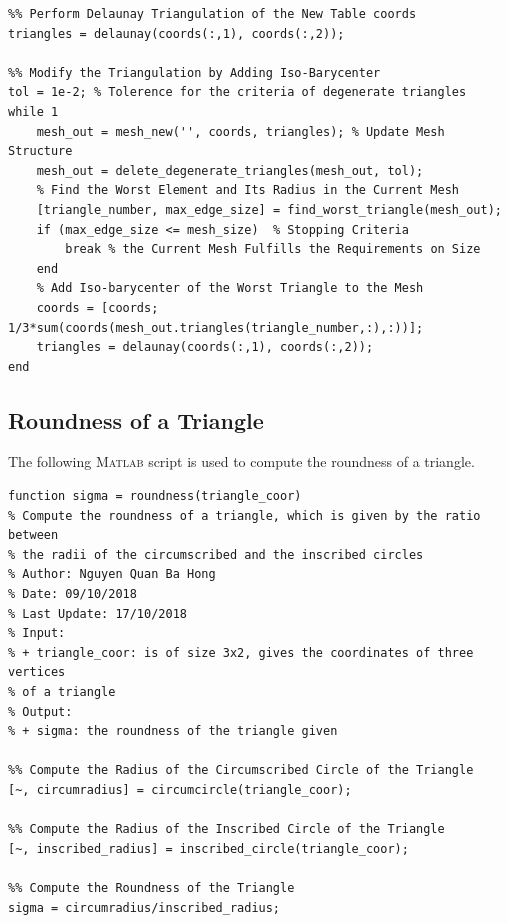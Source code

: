 \documentclass[11pt,a4paper,center,notitlepage]{article}
\numberwithin{equation}{section}
\begin{document}
\begin{verbatim}
%% Perform Delaunay Triangulation of the New Table coords
triangles = delaunay(coords(:,1), coords(:,2));

%% Modify the Triangulation by Adding Iso-Barycenter
tol = 1e-2; % Tolerence for the criteria of degenerate triangles
while 1
    mesh_out = mesh_new('', coords, triangles); % Update Mesh Structure
    mesh_out = delete_degenerate_triangles(mesh_out, tol);
    % Find the Worst Element and Its Radius in the Current Mesh
    [triangle_number, max_edge_size] = find_worst_triangle(mesh_out);
    if (max_edge_size <= mesh_size)  % Stopping Criteria
        break % the Current Mesh Fulfills the Requirements on Size
    end
    % Add Iso-barycenter of the Worst Triangle to the Mesh
    coords = [coords; 1/3*sum(coords(mesh_out.triangles(triangle_number,:),:))];
    triangles = delaunay(coords(:,1), coords(:,2));
end
\end{verbatim}
\subsection{Roundness of a Triangle}
The following \textsc{Matlab} script is used to compute the roundness of a triangle. 
\begin{verbatim}
function sigma = roundness(triangle_coor)
% Compute the roundness of a triangle, which is given by the ratio between
% the radii of the circumscribed and the inscribed circles
% Author: Nguyen Quan Ba Hong
% Date: 09/10/2018
% Last Update: 17/10/2018
% Input:
% + triangle_coor: is of size 3x2, gives the coordinates of three vertices
% of a triangle
% Output:
% + sigma: the roundness of the triangle given

%% Compute the Radius of the Circumscribed Circle of the Triangle 
[~, circumradius] = circumcircle(triangle_coor);

%% Compute the Radius of the Inscribed Circle of the Triangle
[~, inscribed_radius] = inscribed_circle(triangle_coor);

%% Compute the Roundness of the Triangle
sigma = circumradius/inscribed_radius;
\end{verbatim}
\end{document}
